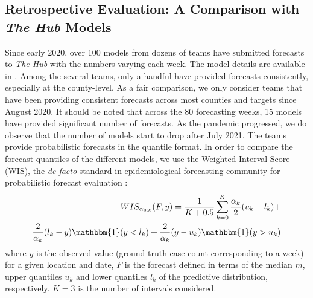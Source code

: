 \documentclass[conference,compsoc]{IEEEtran}
\newcommand{\hub}{\emph{The Hub}}
\begin{document}
\subsection{Retrospective Evaluation: A Comparison with \hub{} Models}\label{sec:comp_hub}
Since early 2020, over 100 models from dozens of teams have submitted forecasts to \hub{} with the numbers varying each week. The model details are available in \cite{COVID-Hub}. Among the several teams, only a handful have provided forecasts consistently, especially at the county-level. As a fair comparison, we only consider teams that have been providing consistent forecasts across most counties and targets since August 2020. It should be noted that across the 80 forecasting weeks, 15 models have provided significant number of forecasts. As the pandemic progressed, we do observe that the number of models start to drop after July 2021. The teams provide probabilistic forecasts in the quantile format. In order to compare the forecast quantiles of the different models, we use the Weighted Interval Score (WIS), the \emph{de facto} standard in epidemiological forecasting community for probabilistic forecast evaluation \cite{bracher2020evaluating}:
\begin{align}
    WIS_{\alpha_{0:k}} (F,y) = \frac{1}{K+0.5} \sum_{k=0}^{K} \frac{\alpha_k}{2} (u_k-l_k) + \nonumber\\ \frac{2}{\alpha_k} (l_k-y) \mathbbm{1}(y<l_k) + \frac{2}{\alpha_k} (y-u_k) \mathbbm{1}(y>u_k)
    \label{eq:wis}
\end{align}
where $y$ is the observed value (ground truth case count corresponding to a week) for a given location and date, $F$ is the forecast defined in terms of the median $m$, upper quantiles $u_k$ and lower quantiles $l_k$ of the predictive distribution, respectively. $K=3$ is the number of intervals considered. 
\end{document}
